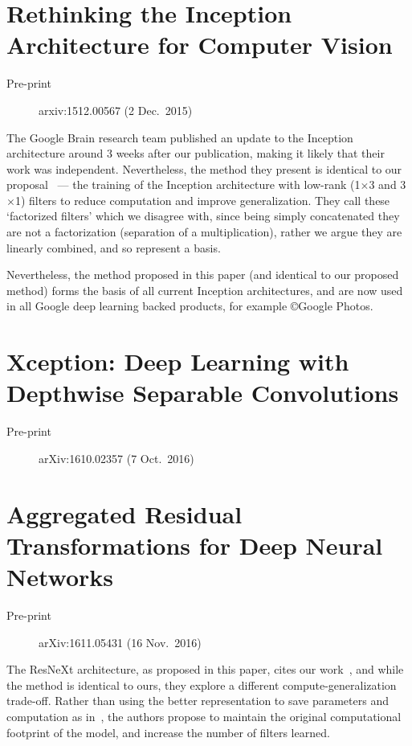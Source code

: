 \documentclass[thesis]{subfiles}
\begin{document}
\tochide\section{Rethinking the Inception Architecture for Computer Vision}
\begin{description}
    \item[Pre-print] arxiv:1512.00567 (2 Dec.\ 2015)
\end{description}
The Google Brain research team published an update to the Inception architecture around 3 weeks after our publication, making it likely that their work was independent. Nevertheless, the method they present is identical to our proposal~\citep{Ioannou2016} --- the training of the Inception architecture with low-rank (\ie{}1$\times$3 and 3$\times$1) filters to reduce computation and improve generalization. They call these `factorized filters' which we disagree with, since being simply concatenated they are not a factorization (\ie separation of a multiplication), rather we argue they are linearly combined, and so represent a basis.

Nevertheless, the method proposed in this paper (and identical to our proposed method) forms the basis of all current Inception architectures, and are now used in all Google deep learning backed products, for example \copyright{}Google Photos.

\tochide\section{Xception: Deep Learning with Depthwise Separable Convolutions}
\begin{description}
    \item[Pre-print] arXiv:1610.02357 (7 Oct.\ 2016)
\end{description}

\tochide\section{Aggregated Residual Transformations for Deep Neural Networks}
\begin{description}
    \item[Pre-print] arXiv:1611.05431 (16 Nov.\ 2016)
\end{description}
The ResNeXt architecture, as proposed in this paper, cites our work~\citep{ioannou2016e}, and while the method is identical to ours, they explore a different compute-generalization trade-off. Rather than using the better representation to save parameters and computation as in~\citep{ioannou2016e}, the authors propose to maintain the original computational footprint of the model, and increase the number of filters learned.
\end{document}
